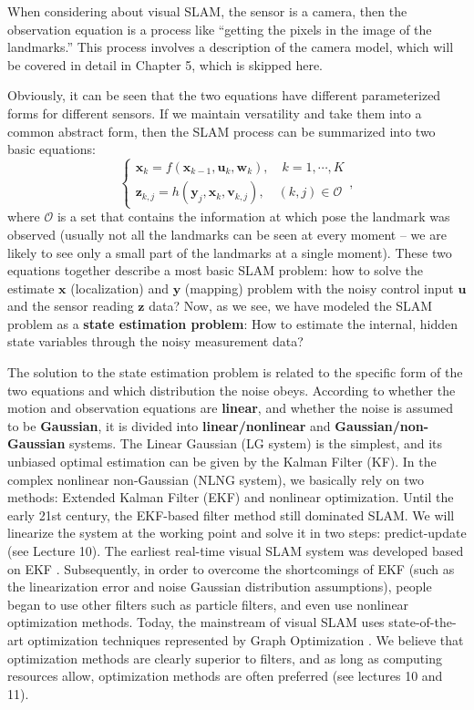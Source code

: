 When considering about visual SLAM, the sensor is a camera, then the observation equation is a process like ``getting the pixels in the image of the landmarks.'' This process involves a description of the camera model, which will be covered in detail in Chapter 5, which is skipped here.

Obviously, it can be seen that the two equations have different parameterized forms for different sensors. If we maintain versatility and take them into a common abstract form, then the SLAM process can be summarized into two basic equations:
\begin{equation}
\label{eq:slamproblem}
\left\{ \begin{array}{l}
{\mathbf{x}_k} = f\left( {{\mathbf{x}_{k - 1}},{\mathbf{u}_k}}, \mathbf{w}_k \right),\quad k=1,\cdots, K\\
{\mathbf{z}_{k,j}} = h\left( {{ \mathbf{y}_j},{ \mathbf{x}_k}}, \mathbf{v}_{k,j} \right), \quad (k,j) \in \mathcal{O}
\end{array} \right. ,
\end{equation}
where $\mathcal{O}$ is a set that contains the information at which pose the landmark was observed (usually not all the landmarks can be seen at every moment – ​​we are likely to see only a small part of the landmarks  at a single moment). These two equations together describe a most basic SLAM problem: how to solve the estimate $\mathbf{x}$ (localization) and $\mathbf{y}$ (mapping) problem with the noisy control input $\mathbf{u}$ and the sensor reading $\mathbf{z}$ data? Now, as we see, we have modeled the SLAM problem as a \textbf{state estimation problem}: How to estimate the internal, hidden state variables through the noisy measurement data?

The solution to the state estimation problem is related to the specific form of the two equations and which distribution the noise obeys. According to whether the motion and observation equations are \textbf{linear}, and whether the noise is assumed to be \textbf{Gaussian}, it is divided into \textbf{linear/nonlinear} and \textbf{Gaussian/non-Gaussian} systems. The Linear Gaussian (LG system) is the simplest, and its unbiased optimal estimation can be given by the Kalman Filter (KF). In the complex nonlinear non-Gaussian (NLNG system), we basically rely on two methods: Extended Kalman Filter (EKF) and nonlinear optimization. Until the early 21st century, the EKF-based filter method still dominated SLAM. We will linearize the system at the working point and solve it in two steps: predict-update (see Lecture 10). The earliest real-time visual SLAM system was developed based on EKF {\cite{Davison2007}}. Subsequently, in order to overcome the shortcomings of EKF (such as the linearization error and noise Gaussian distribution assumptions), people began to use other filters such as particle filters, and even use nonlinear optimization methods. Today, the mainstream of visual SLAM uses state-of-the-art optimization techniques represented by Graph Optimization {\cite{Strasdat2012}}. We believe that optimization methods are clearly superior to filters, and as long as computing resources allow, optimization methods are often preferred (see lectures 10 and 11).

